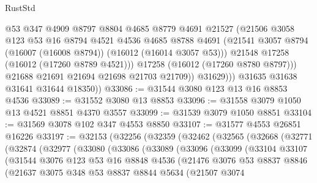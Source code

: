 \begin{lexlean}{RustStd}
\begin{coremodule}
                    @53
                    @347
                    @4909
                    @8797
                    @8804
                    @4685
                    @8779
                    @4691
                    @21527
                    (@21506
                      @3058
                      @123
                      @53
                      @16
                      @8794
                      @4521
                      @4536
                      @4685
                      @8788
                      @4691
                      (@21541 @3057 @8794 (@16007 (@16008 @8794)) (@16012 (@16014 @3057 @53)))
                      @21548
                      @17258
                      (@16012 (@17260 @8789 @4521)))
                    @17258
                    (@16012 (@17260 @8780 @8797)))
                  @21688
                  @21691
                  @21694
                  @21698
                  @21703
                  @21709))
              @31629)))
        @31635
        @31638
        @31641
        @31644
        @18350))
@33086 := @31544 @3080 @123 @13 @16 @8853 @4536
@33089 := @31552 @3080 @13 @8853
@33096 := @31558 @3079 @1050 @13 @4521 @8851 @4370 @3557
@33099 := @31539 @3079 @1050 @8851
@33104 := @31569 @3078 @102 @347 @4553 @8850
@33107 := @31577 @4553 @26851 @16226
@33197 := @32153
    (@32256
      (@32359
        (@32462
          (@32565
            (@32668
              (@32771
                (@32874
                  (@32977
                    (@33080
                      (@33086
                        (@33089
                          (@33096
                            (@33099
                              (@33104
                                @33107
                                (@31544
                                  @3076
                                  @123
                                  @53
                                  @16
                                  @8848
                                  @4536
                                  (@21476
                                    @3076
                                    @53
                                    @8837
                                    @8846
                                    (@21637
                                      @3075
                                      @348
                                      @53
                                      @8837
                                      @8844
                                      @5634
                                      (@21507
                                        @3074

\end{coremodule}
\end{lexlean}
